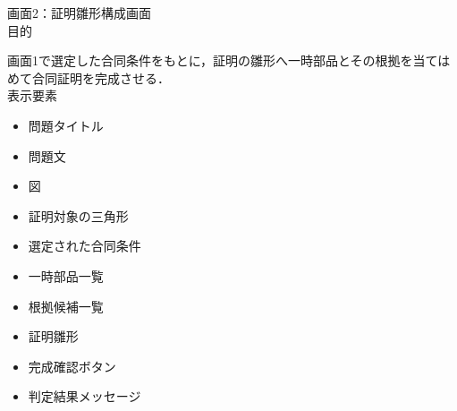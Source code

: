 \documentclass[a4paper,12pt]{ltjsarticle}
\begin{document}
画面2：証明雛形構成画面\\

目的

画面1で選定した合同条件をもとに，証明の雛形へ一時部品とその根拠を当てはめて合同証明を完成させる．\\

表示要素
\begin{itemize}
  \item 問題タイトル
  \item 問題文
  \item 図
  \item 証明対象の三角形
  \item 選定された合同条件
  \item 一時部品一覧
  \item 根拠候補一覧
  \item 証明雛形
  \item 完成確認ボタン
  \item 判定結果メッセージ\\
\end{itemize}
\end{document}

